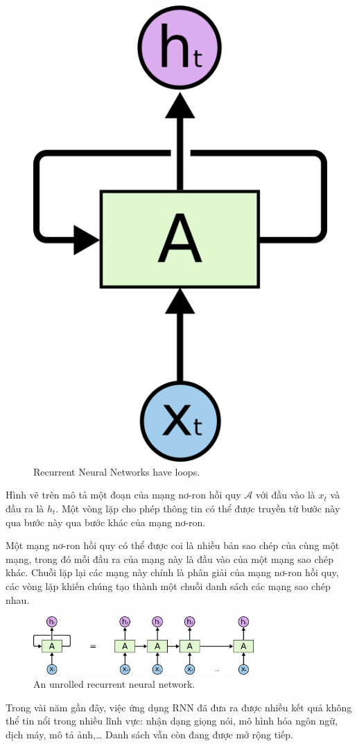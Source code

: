 \begin{figure}[H]
    \centering
    \includegraphics[scale=0.5]{figures/RNN-rolled.png}
    \caption{Recurrent Neural Networks have loops.}
\end{figure}
Hình vẽ trên mô tả một đoạn của mạng nơ-ron hồi quy $\mathcal{A}$ với đầu vào là $x_t$ và đầu ra là $h_t$. Một vòng lặp cho phép thông tin có thể được truyền từ bước này qua bước này qua bước khác của mạng nơ-ron.\par
Một mạng nơ-ron hồi quy có thể được coi là nhiều bản sao chép của cùng một mạng, trong đó mỗi đầu ra của mạng này là đầu vào của một mạng sao chép khác. Chuỗi lặp lại các mạng này chính là phân giải của mạng nơ-ron hồi quy, các vòng lặp khiến chúng tạo thành một chuỗi danh sách các mạng sao chép nhau. \par
\begin{figure}[H]
    \centering
    \includegraphics[width=0.75\textwidth]{figures/RNN-unrolled.png}
    \caption{An unrolled recurrent neural network.}
\end{figure}
Trong vài năm gần đây, việc ứng dụng RNN đã đưa ra được nhiều kết quả không thể tin nổi trong nhiều lĩnh vực: nhận dạng giọng nói, mô hình hóa ngôn ngữ, dịch máy, mô tả ảnh,… Danh sách vẫn còn đang được mở rộng tiếp.
